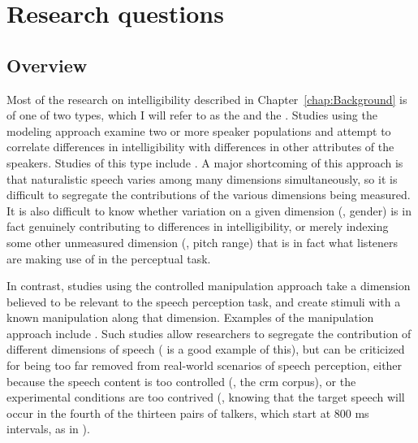 \chapter{Research questions\label{chap:Questions}}

\section{Overview}
Most of the research on intelligibility described in Chapter~\ref{chap:Background} is of one of two types, which I will refer to as the  and the .  Studies using the modeling approach examine two or more speaker populations and attempt to correlate differences in intelligibility with differences in other attributes of the speakers.  Studies of this type include \citet{BondMoore1994, BradlowEtAl1996, HazanMarkham2004, Neel2008}.  A major shortcoming of this approach is that naturalistic speech varies among many dimensions simultaneously, so it is difficult to segregate the contributions of the various dimensions being measured.  It is also difficult to know whether variation on a given dimension (\eg, gender) is in fact genuinely contributing to differences in intelligibility, or merely indexing some other unmeasured dimension (\eg, pitch range) that is in fact what listeners are making use of in the perceptual task.

In contrast, studies using the controlled manipulation approach take a dimension believed to be relevant to the speech perception task, and create stimuli with a known manipulation along that dimension.  Examples of the manipulation approach include \citet{KiddEtAl2005a, KitterickEtAl2010, DubnoEtAl2012}.  Such studies allow researchers to segregate the contribution of different dimensions of speech (\citet{KitterickEtAl2010} is a good example of this), but can be criticized for being too far removed from real-world scenarios of speech perception, either because the speech content is too controlled (\ie, the \ac{crm} corpus), or the experimental conditions are too contrived (\eg, knowing that the target speech will occur in the fourth of the thirteen pairs of talkers, which start at 800 ms intervals, as in \citealt{KitterickEtAl2010}).

